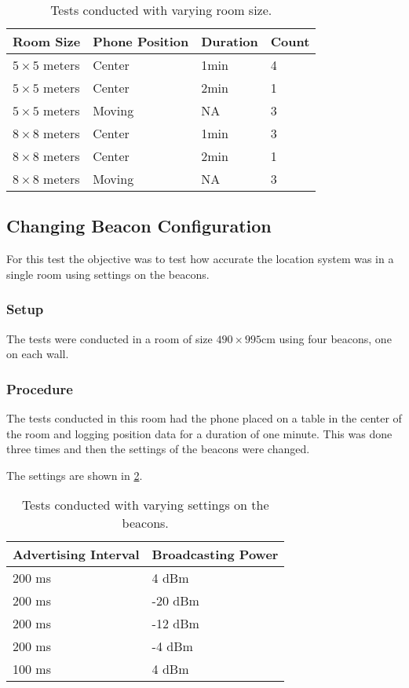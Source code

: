 \begin{table}[h!]
\centering
\begin{tabular}{|l|l|l|l|}
\hline
Room Size  & Phone Position & Duration & Count \\ \hline
$5\times 5$ meters & Center         & 1min     & 4     \\ \hline
$5\times 5$ meters & Center         & 2min     & 1     \\ \hline
$5\times 5$ meters & Moving         & NA       & 3     \\ \hline
$8\times 8$ meters & Center         & 1min     & 3     \\ \hline
$8\times 8$ meters & Center         & 2min     & 1     \\ \hline
$8\times 8$ meters & Moving         & NA       & 3     \\ \hline
\end{tabular}
\caption{Tests conducted with varying room size.}
\label{table:precisiontest:roomsize}
\end{table}

\subsection{Changing Beacon Configuration}
For this test the objective was to test how accurate the location system was in a single room using settings on the beacons.

\subsubsection*{Setup}
The tests were conducted in a room of size $490\times 995$cm using four beacons, one on each wall.

\subsubsection*{Procedure}
The tests conducted in this room had the phone placed on a table in the center of the room and logging position data for a duration of one minute.
This was done three times and then the settings of the beacons were changed.

The settings are shown in \cref{table:precisiontest:settings}.

\begin{table}[h!]
\centering
\begin{tabular}{l|l}
Advertising Interval & Broadcasting Power \\ \hline
200 ms               & 4 dBm              \\ 
200 ms               & -20 dBm            \\ 
200 ms               & -12 dBm            \\ 
200 ms               & -4 dBm             \\ 
100 ms               & 4 dBm              \\ 
\end{tabular}
\caption{Tests conducted with varying settings on the beacons.}
\label{table:precisiontest:settings}
\end{table}


